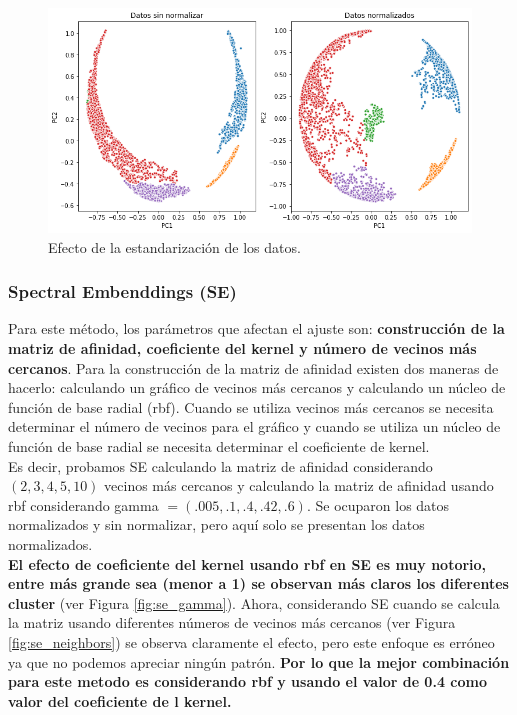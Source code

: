 \documentclass[paper=letter, fontsize=11pt]{scrartcl}
\numberwithin{equation}{section} %
\numberwithin{figure}{section} %
\numberwithin{table}{section} %
\begin{document}
\begin{figure}[H]
    \centering
    \includegraphics[scale=0.35]{figure/kpca_std.png}
    \caption{Efecto de la estandarización de los datos.}
    \label{fig:kpca_std}
\end{figure}

\subsubsection*{Spectral Embenddings (SE)}
Para este método, los parámetros que afectan el ajuste son: \textbf{construcción de la matriz de afinidad, coeficiente del kernel y número de vecinos más cercanos}. Para la construcción de la matriz de afinidad existen dos maneras de hacerlo: calculando un gráfico de vecinos más cercanos y calculando un núcleo de función de base radial (rbf). Cuando se utiliza vecinos más cercanos se necesita determinar el número de vecinos para el gráfico y cuando se utiliza un núcleo de función de base radial se necesita determinar el coeficiente de kernel. \\

Es decir, probamos SE calculando la matriz de afinidad considerando $(2, 3, 4, 5, 10)$ vecinos más cercanos y calculando la matriz de afinidad usando rbf considerando gamma  $=(.005, .1, .4, .42, .6)$. Se ocuparon los datos normalizados y sin normalizar, pero aquí solo se presentan los datos normalizados. \\

\textbf{El efecto de coeficiente del kernel usando rbf en SE es muy notorio, entre más grande sea (menor a 1) se observan más claros los diferentes cluster} (ver Figura \ref{fig:se_gamma}). Ahora, considerando SE cuando se calcula la matriz usando diferentes números de vecinos más cercanos (ver Figura \ref{fig:se_neighbors}) se observa claramente el efecto, pero este enfoque es erróneo ya que no podemos apreciar ningún patrón. \textbf{Por lo que la mejor combinación para este metodo es considerando rbf y usando el valor de 0.4 como valor del coeficiente de l kernel.}
\end{document}
